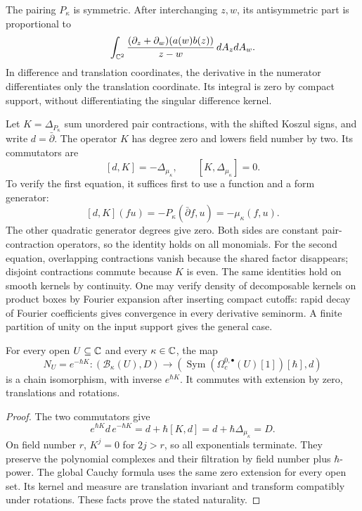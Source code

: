 The pairing $P_\kappa$ is symmetric.  After interchanging $z,w$, its
antisymmetric part is proportional to
\[
 \int_{\mathbb C^2}
 \frac{(\partial_z+\partial_w)(a(w)b(z))}{z-w}\,dA_zdA_w.
\]
In difference and translation coordinates, the derivative in the
numerator differentiates only the translation coordinate.  Its
integral is zero by compact support, without differentiating the
singular difference kernel.

Let $K=\Delta_{P_\kappa}$ sum unordered pair contractions, with the
shifted Koszul signs, and write $d=\bar\partial$.  The operator $K$
has degree zero and lowers field number by two.  Its commutators are
\[
 [d,K]=-\Delta_{\mu_\kappa},\qquad
 [K,\Delta_{\mu_\kappa}]=0.
\]
To verify the first equation, it suffices first to use a function
and a form generator:
\[
 [d,K](fu)=-P_\kappa(\bar\partial f,u)
                       =-\mu_\kappa(f,u).
\]
The other quadratic generator degrees give zero.  Both sides are
constant pair-contraction operators, so the identity holds on all
monomials.  For the second equation, overlapping contractions vanish
because the shared factor disappears; disjoint contractions commute
because $K$ is even.  The same identities hold on smooth kernels by
continuity.  One may verify density of decomposable kernels on product
boxes by Fourier expansion after inserting compact cutoffs: rapid
decay of Fourier coefficients gives convergence in every derivative
seminorm.  A finite partition of unity on the input support gives
the general case.

\begin{proposition}
\label{prop:bf-cauchy-conjugation}
For every open $U\subseteq\mathbb C$ and every $\kappa\in\mathbb C$, the map
\[
 N_U=e^{-\hbar K}:
 (\mathcal B_\kappa(U),D)
       \longrightarrow
 (\operatorname{Sym}(\Omega_c^{0,\bullet}(U)[1])[\hbar],d)
\]
is a chain isomorphism, with inverse $e^{\hbar K}$.  It commutes
with extension by zero, translations and rotations.
\end{proposition}
\begin{proof}
The two commutators give
\[
 e^{\hbar K}d\,e^{-\hbar K}
   =d+\hbar[K,d]=d+\hbar\Delta_{\mu_\kappa}=D.
\]
On field number $r$, $K^j=0$ for $2j>r$, so all exponentials terminate.
They preserve the polynomial complexes and their filtration by
field number plus $\hbar$-power.  The global Cauchy formula uses the
same zero extension for every open set.  Its kernel and measure are
translation invariant and transform compatibly under rotations.
These facts prove the stated naturality.
\end{proof}

